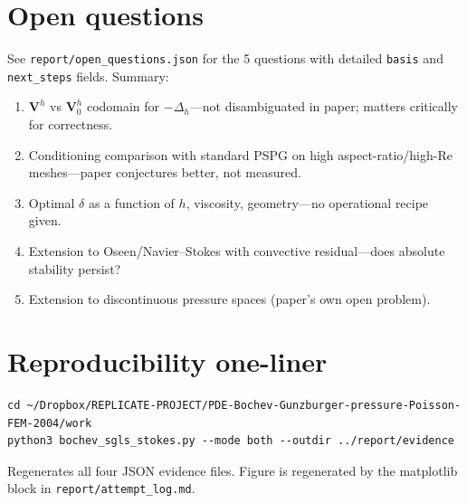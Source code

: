 \documentclass[11pt]{article}
\begin{document}
\section{Open questions}

See \texttt{report/open\_questions.json} for the 5 questions with detailed \texttt{basis} and \texttt{next\_steps} fields. Summary:
\begin{enumerate}
    \item[Q1] $\mathbf{V}^h$ vs $\mathbf{V}^h_0$ codomain for $-\Delta_h$---not disambiguated in paper; matters critically for correctness.
    \item[Q2] Conditioning comparison with standard PSPG on high aspect-ratio/high-Re meshes---paper conjectures better, not measured.
    \item[Q3] Optimal $\delta$ as a function of $h$, viscosity, geometry---no operational recipe given.
    \item[Q4] Extension to Oseen/Navier--Stokes with convective residual---does absolute stability persist?
    \item[Q5] Extension to discontinuous pressure spaces (paper's own open problem).
\end{enumerate}

\section{Reproducibility one-liner}

\begin{verbatim}
cd ~/Dropbox/REPLICATE-PROJECT/PDE-Bochev-Gunzburger-pressure-Poisson-FEM-2004/work
python3 bochev_sgls_stokes.py --mode both --outdir ../report/evidence
\end{verbatim}

Regenerates all four JSON evidence files. Figure is regenerated by the matplotlib block in \texttt{report/attempt\_log.md}.
\end{document}
